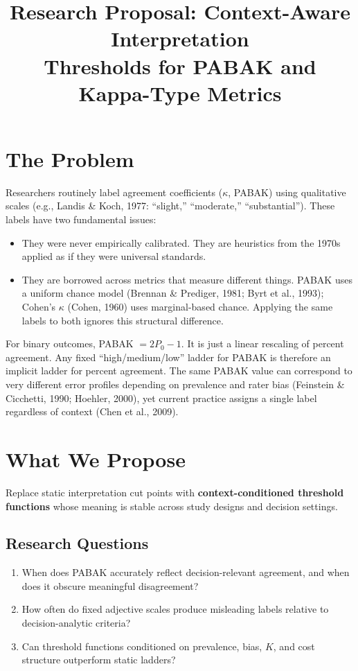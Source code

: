 \documentclass[11pt]{article}
\title{\vspace{-1.5cm}\textbf{Research Proposal: Context-Aware Interpretation\\Thresholds for PABAK and Kappa-Type Metrics}}
\author{}
\date{}
\begin{document}
\maketitle
\vspace{-1.2cm}

\section*{The Problem}

Researchers routinely label agreement coefficients ($\kappa$, PABAK) using qualitative scales (e.g., Landis \& Koch, 1977: ``slight,'' ``moderate,'' ``substantial''). These labels have two fundamental issues:

\begin{itemize}[nosep, leftmargin=1.5em]
    \item They were never empirically calibrated. They are heuristics from the 1970s applied as if they were universal standards.
    \item They are borrowed across metrics that measure different things. PABAK uses a uniform chance model (Brennan \& Prediger, 1981; Byrt et al., 1993); Cohen's $\kappa$ (Cohen, 1960) uses marginal-based chance. Applying the same labels to both ignores this structural difference.
\end{itemize}

For binary outcomes, PABAK $= 2P_0 - 1$. It is just a linear rescaling of percent agreement. Any fixed ``high/medium/low'' ladder for PABAK is therefore an implicit ladder for percent agreement. The same PABAK value can correspond to very different error profiles depending on prevalence and rater bias (Feinstein \& Cicchetti, 1990; Hoehler, 2000), yet current practice assigns a single label regardless of context (Chen et al., 2009).

\section*{What We Propose}

Replace static interpretation cut points with \textbf{context-conditioned threshold functions} whose meaning is stable across study designs and decision settings.

\subsection*{Research Questions}
\begin{enumerate}[nosep, leftmargin=1.5em]
    \item When does PABAK accurately reflect decision-relevant agreement, and when does it obscure meaningful disagreement?
    \item How often do fixed adjective scales produce misleading labels relative to decision-analytic criteria?
    \item Can threshold functions conditioned on prevalence, bias, $K$, and cost structure outperform static ladders?
\end{enumerate}
\end{document}
